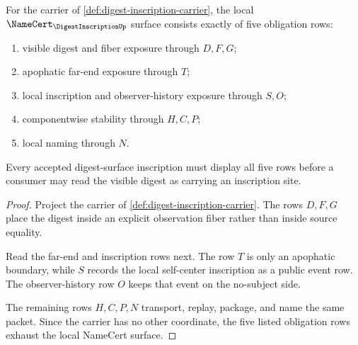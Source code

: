 \begin{theorem}
\label{thm:digest-inscription-namecert-obligations}
For the carrier of \autoref{def:digest-inscription-carrier}, the local $\NameCert_{\DigestInscriptionUp}$ surface consists exactly of five obligation rows:
\begin{enumerate}
\item visible digest and fiber exposure through $D,F,G$;
\item apophatic far-end exposure through $T$;
\item local inscription and observer-history exposure through $S,O$;
\item componentwise stability through $H,C,P$;
\item local naming through $N$.
\end{enumerate}
Every accepted digest-surface inscription must display all five rows before a consumer may read the visible digest as carrying an inscription site.
\end{theorem}
\begin{proof}
Project the carrier of \autoref{def:digest-inscription-carrier}. The rows $D,F,G$ place the digest inside an explicit observation fiber rather than inside source equality.

Read the far-end and inscription rows next. The row $T$ is only an apophatic boundary, while $S$ records the local self-center inscription as a public event row. The observer-history row $O$ keeps that event on the no-subject side.

The remaining rows $H,C,P,N$ transport, replay, package, and name the same packet. Since the carrier has no other coordinate, the five listed obligation rows exhaust the local NameCert surface.
\end{proof}

